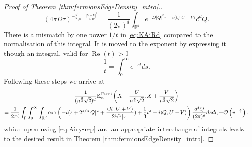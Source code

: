\documentclass[%
 jmp,
cp,  %
 amsmath,amsthm,amssymb,%
 reprint,%
onecolumn]{revtex4-2}
\renewcommand{\Re}{\operatorname{Re}}
\begin{document}
\begin{proof}[Proof of Theorem \ref{thm:fermionsEdgeDensity_intro}.]
\begin{equation}\label{eq:propagator}
(4\pi D\tau)^{-\frac{d}{2}}e^{-\frac{|U-V|^2}{4D\tau}}
=\frac{1}{(2\pi)^d}\int_{\mathbb{R}^d} e^{-D|Q|^2\tau-i\langle Q, U-V\rangle} d^dQ.
\end{equation}
There is a mismatch by one power $1/t$ in \eqref{eq:KAiRd} compared to the normalisation of this integral. It is moved to the exponent by expressing it though an integral, valid for $\Re(t)>0$
\begin{equation}\label{eq:1/t}
\frac{1}{t} =\int_0^\infty e^{-st} ds.
\end{equation}
Following these steps we arrive at 
\begin{multline*}
\frac{1}{(n^\frac{2}{3} \sqrt 2)^d}{\mathbb K}^{\rm Fermi}_n\left(X+\frac{U}{n^\frac{2}{3}\sqrt 2}, X + \frac{V}{n^\frac{2}{3}\sqrt 2}\right) 
\\
=\frac{1}{2\pi i} \int_{\Gamma} \int_0^\infty \int_{\mathbb{R}^d} 
\exp\left(-t(s+2^{2/3}|Q|^2+\frac{\langle X,U+V\rangle}{2^{1/3}|x|})+\frac13 t^3-i\langle Q,U-V\rangle\right) \frac{d^dQ}{(2\pi)^d}ds dt,\nonumber
+ \mathcal O\left(n^{-\frac{1}{3}}\right).
\end{multline*}
which upon using \eqref{eq:Airy-rep} and an appropriate interchange of integrals leads to the desired result in Theorem \ref{thm:fermionsEdgeDensity_intro}.
\end{proof}
\end{document}
